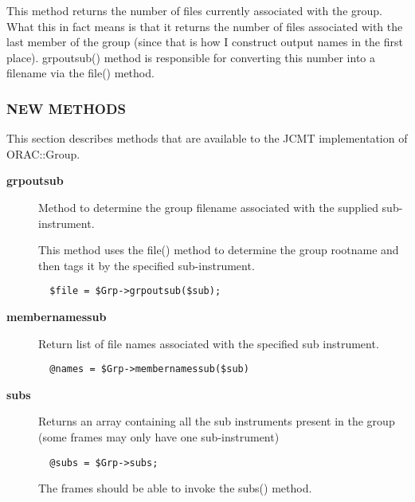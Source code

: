 \begin{description}
\begin{description}
This method returns the number of files currently associated
with the group. What this in fact means is that it returns
the number of files associated with the last member of the 
group (since that is how I construct output names in the
first place). grpoutsub() method is responsible for 
converting this number into a filename via the file() method.

\end{description}
\subsubsection*{NEW METHODS\label{ORAC::Group::JCMT_NEW_METHODS}}


This section describes methods that are available to the
JCMT implementation of ORAC::Group.

\begin{description}

\item[{\textbf{grpoutsub}}] \mbox{}

Method to determine the group filename associated with
the supplied sub-instrument.



This method uses the file() method to determine the
group rootname and then tags it by the specified sub-instrument.

\begin{verbatim}
  $file = $Grp->grpoutsub($sub);
\end{verbatim}

\item[{\textbf{membernamessub}}] \mbox{}

Return list of file names associated with the specified
sub instrument.

\begin{verbatim}
  @names = $Grp->membernamessub($sub)
\end{verbatim}

\item[{\textbf{subs}}] \mbox{}

Returns an array containing all the sub instruments present
in the group (some frames may only have one sub-instrument)

\begin{verbatim}
  @subs = $Grp->subs;
\end{verbatim}


The frames should be able to invoke the subs() method.

\end{description}

\end{description}
